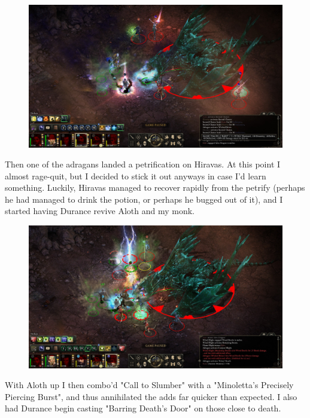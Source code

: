 \documentclass{article}
\begin{document}
\begin{figure}
\includegraphics[scale=0.33]{files/blog/2019_03_17_pillars_of_eternity_path_of_the_damned_act_iv/2019_03_17_dragon1_03.jpg}
\end{figure}

Then one of the adragans landed a petrification on Hiravas.  At this point I almost rage-quit, but I decided to stick it out anyways in case I'd learn something.  Luckily, Hiravas managed to recover rapidly from the petrify (perhaps he had managed to drink the potion, or perhaps he bugged out of it), and I started having Durance revive Aloth and my monk.

\begin{figure}
\includegraphics[scale=0.33]{files/blog/2019_03_17_pillars_of_eternity_path_of_the_damned_act_iv/2019_03_17_dragon1_04.jpg}
\end{figure}

With Aloth up I then combo'd "Call to Slumber" with a "Minoletta's Precisely Piercing Burst", and thus annihilated the adds far quicker than expected.  I also had Durance begin casting "Barring Death's Door" on those close to death.
\end{document}
